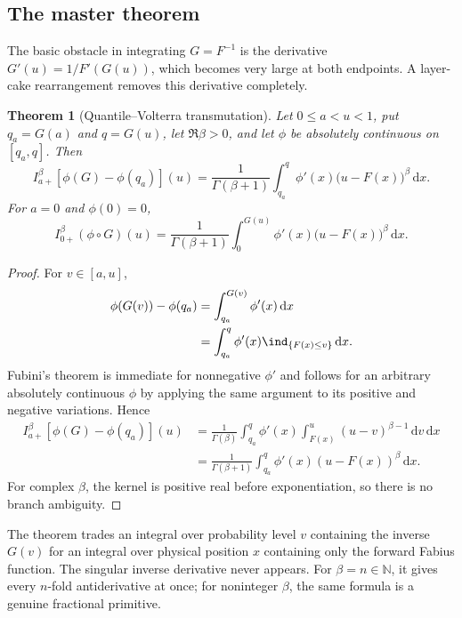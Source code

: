 \documentclass[11pt,oneside]{article}
\newtheorem{theorem}{Theorem}[section]
\theoremstyle{definition}
\theoremstyle{remark}
\newcommand{\N}{\mathbb N}
\newcommand{\dd}{\,\mathrm d}
\newcommand{\1}{\mathbf 1}
\begin{document}
\subsection{The master theorem}

The basic obstacle in integrating $G=F^{-1}$ is the derivative
$G'(u)=1/F'(G(u))$, which becomes very large at both endpoints.  A layer-cake
rearrangement removes this derivative completely.

\begin{theorem}[Quantile--Volterra transmutation]
\label{p11:thm:quantile-transmutation}
Let $0\le a<u<1$, put $q_a=G(a)$ and $q=G(u)$, let $\Re\beta>0$, and let
$\phi$ be absolutely continuous on $[q_a,q]$.  Then
\begin{equation}
 I_{a+}^{\beta}\!\left[\phi(G)-\phi(q_a)\right](u)
 =\frac1{\Gamma(\beta+1)}
  \int_{q_a}^{q}\phi'(x)\bigl(u-F(x)\bigr)^\beta\dd x.
 \label{p11:eq:quantile-transmutation}
\end{equation}
For $a=0$ and $\phi(0)=0$,
\begin{equation}
 I_{0+}^{\beta}(\phi\circ G)(u)
 =\frac1{\Gamma(\beta+1)}
  \int_0^{G(u)}\phi'(x)\bigl(u-F(x)\bigr)^\beta\dd x.
 \label{p11:eq:quantile-transmutation-zero}
\end{equation}
\end{theorem}

\begin{proof}
For $v\in[a,u]$,
\begin{align}
 \phi(G(v))-\phi(q_a)
 &=\int_{q_a}^{G(v)}\phi'(x)\dd x\\
 &=\int_{q_a}^{q}\phi'(x)\ind_{\{F(x)\le v\}}\dd x.
\end{align}
Fubini's theorem is immediate for nonnegative $\phi'$ and follows for an
arbitrary absolutely continuous $\phi$ by applying the same argument to its
positive and negative variations.  Hence
\begin{align}
 I_{a+}^{\beta}[\phi(G)-\phi(q_a)](u)
 &=\frac1{\Gamma(\beta)}
   \int_{q_a}^{q}\phi'(x)
   \int_{F(x)}^u(u-v)^{\beta-1}\dd v\dd x\\
 &=\frac1{\Gamma(\beta+1)}
   \int_{q_a}^{q}\phi'(x)(u-F(x))^\beta\dd x.
\end{align}
For complex $\beta$, the kernel is positive real before exponentiation, so
there is no branch ambiguity.
\end{proof}

\begin{boxedresult}
The theorem trades an integral over probability level $v$ containing the
inverse $G(v)$ for an integral over physical position $x$ containing only the
forward Fabius function.  The singular inverse derivative never appears.
For $\beta=n\in\N$, it gives every $n$-fold antiderivative at once; for
noninteger $\beta$, the same formula is a genuine fractional primitive.
\end{boxedresult}
\end{document}
